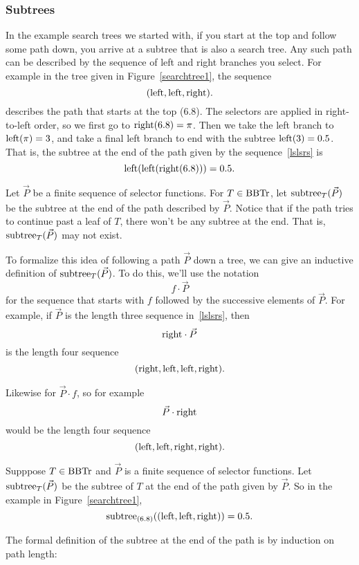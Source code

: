 \subsubsection{Subtrees}

In the example search trees we started with, if you start at the top
and follow some path down, you arrive at a subtree that is also a
search tree.  Any such path can be described by the sequence of left
and right branches you select.  For example in the tree given in
Figure~\ref{searchtree1}, the sequence
\begin{equation}\label{lslsrs}
(\text{left},\text{left},\text{right}).
\end{equation}
describes the path that starts at the top (6.8).  The selectors are
applied in right-to-left order, so we first go to $\text{right}(6.8) =
\pi$.  Then we take the left branch to $\text{left}(\pi) = 3$, and take a
final left branch to end with the subtree $\text{left}(3) = 0.5$.  That
is, the subtree at the end of the path given by the sequence~\eqref{lslsrs} is
\[
\text{left}(\text{left}(\text{right}(6.8))) = 0.5.
\]

Let $\vec{P}$ be a finite sequence of selector functions.  For $T \in
\text{BBTr}$, let $\text{subtree}_{T}(\vec{P})$ be the subtree at the end of the
path described by $\vec{P}$.  Notice that if the path tries to
continue past a leaf of $T$, there won't be any subtree at the end.
That is, $\text{subtree}_{T}(\vec{P})$ may not exist.

To formalize this idea of following a path $\vec{P}$ down a tree, we
can give an inductive definition of $\text{subtree}_{T}(\vec{P})$.  To do
this, we'll use the notation
\[
f \cdot \vec{P}
\]
for the sequence that starts with $f$ followed by the successive
elements of $\vec{P}$.  For example, if $\vec{P}$ is the length three
sequence in~\eqref{lslsrs}, then
\[
\text{right} \cdot \vec{P}
\]
is the length four sequence
\[
(\text{right}, \text{left},\text{left},\text{right}).
\]

Likewise for $\vec{P} \cdot f$, so for example
\[
 \vec{P} \cdot \text{right}
\]
would be the length four sequence
\[
(\text{left},\text{left},\text{right},\text{right}).
\]

Supppose $T \in \text{BBTr}$ and $\vec{P}$ is a finite sequence of selector
functions.  Let $\text{subtree}_{T}(\vec{P})$ be the subtree of $T$ at the end
of the path given by $\vec{P}$.  So in the example in Figure~\ref{searchtree1},
\[
\text{subtree}_{(6.8)}((\text{left},\text{left},\text{right})) = 0.5.
\]

The formal definition of the subtree at the end of the path is by
induction on path length:

